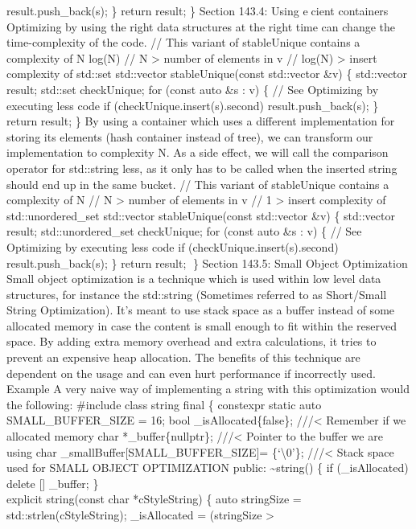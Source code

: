 result.push\_back(s); \} return result; \} Section 143.4: Using ecient
containers Optimizing by using the right data structures at the right
time can change the time-complexity of the code. // This variant of
stableUnique contains a complexity of N log(N) // N \textgreater{}
number of elements in v // log(N) \textgreater{} insert complexity of
std::set std::vector stableUnique(const std::vector \&v) \{ std::vector
result; std::set checkUnique; for (const auto \&s : v) \{ // See
Optimizing by executing less code if (checkUnique.insert(s).second)
result.push\_back(s); \} return result; \} By using a container which
uses a diﬀerent implementation for storing its elements (hash container
instead of tree), we can transform our implementation to complexity N.
As a side eﬀect, we will call the comparison operator for std::string
less, as it only has to be called when the inserted string should end up
in the same bucket. // This variant of stableUnique contains a
complexity of N // N \textgreater{} number of elements in v // 1
\textgreater{} insert complexity of std::unordered\_set std::vector
stableUnique(const std::vector \&v) \{ std::vector result;
std::unordered\_set checkUnique; for (const auto \&s : v) \{ // See
Optimizing by executing less code if (checkUnique.insert(s).second)
result.push\_back(s); \} return result; \} Section 143.5: Small Object
Optimization Small object optimization is a technique which is used
within low level data structures, for instance the std::string
(Sometimes referred to as Short/Small String Optimization). It's meant
to use stack space as a buﬀer instead of some allocated memory in case
the content is small enough to ﬁt within the reserved space. By adding
extra memory overhead and extra calculations, it tries to prevent an
expensive heap allocation. The beneﬁts of this technique are dependent
on the usage and can even hurt performance if incorrectly used. Example
A very naive way of implementing a string with this optimization would
the following: \#include class string final \{ constexpr static auto
SMALL\_BUFFER\_SIZE = 16; bool \_isAllocated\{false\}; ///\textless{}
Remember if we allocated memory char *\_buffer\{nullptr\};
///\textless{} Pointer to the buffer we are using char
\_smallBuffer{[}SMALL\_BUFFER\_SIZE{]}= \{`\textbackslash0'\};
///\textless{} Stack space used for SMALL OBJECT OPTIMIZATION public:
\textasciitilde string() \{ if (\_isAllocated) delete {[}{]} \_buffer;
\}\\
explicit string(const char *cStyleString) \{ auto stringSize =
std::strlen(cStyleString); \_isAllocated = (stringSize \textgreater{}
